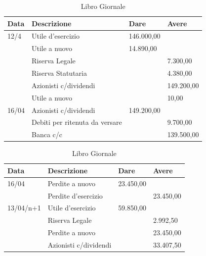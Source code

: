 \documentclass{report}
\begin{document}
\begin{table}[h]
    \centering
    \caption{Libro Giornale}
    \begin{tabular}{|l|l|l|l|}
    \hline
    Data & Descrizione & Dare & Avere \\
    \hline
    12/4 & Utile d'esercizio &146.000,00 & \\
         &  Utile a nuovo & 14.890,00 &  \\
         &  Riserva Legale & & 7.300,00\\
         &  Riserva Statutaria & & 4.380,00\\
         & Azionisti c/dividendi & & 149.200,00\\
         & Utile a nuovo & & 10,00 \\
    \hline
    16/04 & Azionisti c/dividendi & 149.200,00 & \\
         & Debiti per ritenuta da versare &  & 9.700,00 \\
         & Banca c/c & & 139.500,00 \\
    \hline
    \end{tabular}
\end{table}



\begin{table}[h]
    \centering
    \caption{Libro Giornale}
    \begin{tabular}{|l|l|l|l|}
    \hline
    Data & Descrizione & Dare & Avere \\
    \hline
    16/04 & Perdite a nuovo & 23.450,00  & \\
         & Perdite d'esercizio &  &  23.450,00\\
    \hline
    13/04/n+1 & Utile d'esercizio & 59.850,00& \\
         & Riserva Legale &  & 2.992,50 \\
         & Perdite a nuovo & & 23.450,00 \\
         & Azionisti c/dividendi & & 33.407,50 \\
    \hline
    \end{tabular}
\end{table}
\end{document}
